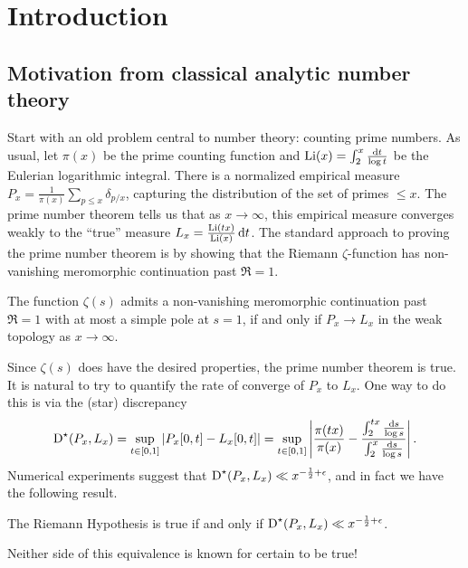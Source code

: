 
\chapter{Introduction}





\section{Motivation from classical analytic number theory}

Start with an old problem central to number theory: counting 
prime numbers. As usual, let $\pi(x)$ be the prime counting function and 
$\operatorname{Li}(x) = \int_2^x \frac{\mathrm{d} t}{\log t}$ be the Eulerian logarithmic integral. 
There is a normalized empirical measure 
$P_x = \frac{1}{\pi(x)} \sum_{p\leqslant x} \delta_{p/x}$, capturing the 
distribution of the set of primes $\leqslant x$. The prime number theorem 
tells us that as $x\to \infty$, this empirical measure converges weakly to the 
``true'' measure $L_x = \frac{\operatorname{Li}(t x)}{\operatorname{Li}(x)}\, \mathrm{d} t$. The standard approach 
to proving the prime number theorem is by showing that the Riemann 
$\zeta$-function has non-vanishing meromorphic continuation past $\Re = 1$.

\begin{theorem}
The function $\zeta(s)$ admits a non-vanishing meromorphic continuation past 
$\Re = 1$ with at most a simple pole at $s=1$, if and only if 
$P_x \to L_x$ in the weak topology as $x\to \infty$. 
\end{theorem}

Since $\zeta(s)$ does have the desired properties, the prime number 
theorem is true. It is natural to try to quantify the rate of converge of $P_x$ 
to $L_x$. One way to do this is via the (star) discrepancy 
\[
	\operatorname{D}^\star(P_x,L_x) 
		= \sup_{t\in [0,1]} \left| P_x[0,t] - L_x[0,t]\right|
		= \sup_{t\in [0,1]} \left| \frac{\pi(t x)}{\pi(x)} - \frac{\int_2^{tx} \frac{\mathrm{d} s}{\log s}}{\int_2^x \frac{\mathrm{d} s}{\log s}}\right| .
\]
Numerical experiments suggest that 
$\operatorname{D}^\star(P_x,L_x) \ll x^{-\frac 1 2+\epsilon}$, and in fact we have the 
following result. 

\begin{theorem}
The Riemann Hypothesis is true if and only if 
$\operatorname{D}^\star(P_x,L_x) \ll x^{-\frac 1 2+\epsilon}$. 
\end{theorem}

Neither side of this equivalence is known for certain to be true! 


